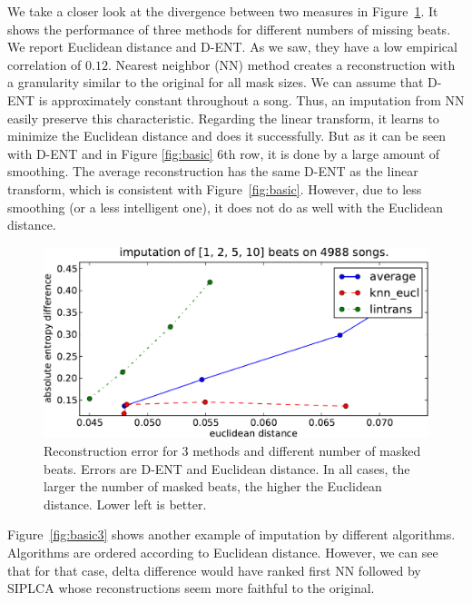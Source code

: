 \documentclass{article}
\begin{document}
We take a closer look at the divergence between two measures in
Figure~\ref{fig:2dscore}.  It shows the performance of three methods
for different numbers of missing beats. We report Euclidean distance
and D-ENT. As we saw, they have a low empirical correlation of
$0.12$. Nearest neighbor (NN) method creates a reconstruction with a
granularity similar to the original for all mask sizes. We can assume
that D-ENT is approximately constant throughout a song. Thus, an
imputation from NN easily preserve this characteristic.  Regarding the
linear transform, it learns to minimize the Euclidean distance and
does it successfully. But as it can be seen with D-ENT and in Figure
\ref{fig:basic} $6$th row, it is done by a large amount of
smoothing. The average reconstruction has the same D-ENT as the linear
transform, which is consistent with
Figure~\ref{fig:basic}.  However, due to less
smoothing (or a less intelligent one), it does not do as well with the
Euclidean distance.

\begin{figure}[t]
\begin{center}
\includegraphics[width=.8\columnwidth]{recon_score_in_2d_5k}
\end{center}
\caption{Reconstruction error for $3$ methods and different
number of masked beats. Errors are D-ENT and Euclidean
distance. In all cases, the larger the number of masked beats,
the higher the Euclidean distance. Lower left is better.
\label{fig:2dscore}}
\end{figure}

Figure~\ref{fig:basic3} shows another example of imputation by
different algorithms. Algorithms are ordered according to Euclidean
distance.  However, we can see that for that case, delta difference
would have ranked first NN followed by SIPLCA whose reconstructions
seem more faithful to the original.
\end{document}
